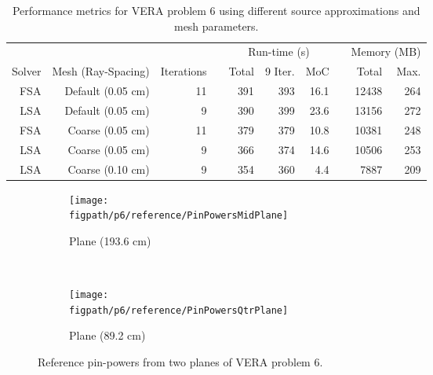 {{{      \begin{table}[htbp]
        \centering
        \caption{
          Performance metrics for VERA problem 6 using different source approximations and mesh parameters.
        }
        \label{tab:LSMOC:P6:Performance}
        \begin{tabular}{rrrrrrrrrr}\toprule
                 &                    &            & \phantom{aa}& \multicolumn{3}{c}{Run-time (s)} & \phantom{aa} &\multicolumn{2}{c}{Memory (MB)}\\\cline{5-7}\cline{9-10}
          Solver & Mesh (Ray-Spacing) & Iterations && Total & 9 Iter. & MoC  && Total & Max.\\\midrule
          FSA    & Default (0.05 cm)  & 11         && 391 & 393 & 16.1 && 12438 & 264\\
          LSA    & Default (0.05 cm)  &  9         && 390 & 399 & 23.6 && 13156 & 272\\
          FSA    & Coarse  (0.05 cm)  & 11         && 379 & 379 & 10.8 && 10381 & 248\\
          LSA    & Coarse  (0.05 cm)  &  9         && 366 & 374 & 14.6 && 10506 & 253\\
          LSA    & Coarse  (0.10 cm)  &  9         && 354 & 360 &  4.4 &&  7887 & 209\\\bottomrule
        \end{tabular}
      \end{table}

      \begin{figure}[h]
        \centering
        \begin{subfigure}[t]{0.49\textwidth}
          \centering
          \texttt{[image: \\figpath/p6/reference/PinPowersMidPlane]}
          \caption{Plane (193.6 cm)\label{fig:LSMOC:P6:PinPowers:MidPlane}}
        \end{subfigure}%
        ~
        \begin{subfigure}[t]{0.49\textwidth}
          \centering
            \texttt{[image: \\figpath/p6/reference/PinPowersQtrPlane]}
            \caption{Plane (89.2 cm)\label{fig:LSMOC:P6:PinPowers:QtrPlane}}
        \end{subfigure}
        \caption{Reference pin-powers from two planes of VERA problem 6.}
        \label{figs:LSMOC:P6:Reference:PinPowers:Planes}
      \end{figure}

}}}
